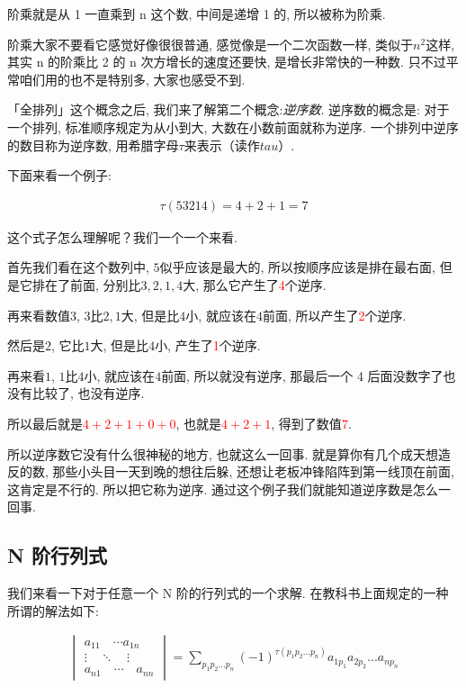 阶乘就是从 1 一直乘到 n 这个数, 中间是递增 1 的, 所以被称为阶乘. 

阶乘大家不要看它感觉好像很很普通, 感觉像是一个二次函数一样, 类似于$n^2$这样, 其实 n 的阶乘比 2 的 n 次方增长的速度还要快, 是增长非常快的一种数. 只不过平常咱们用的也不是特别多, 大家也感受不到. 

「全排列」这个概念之后, 我们来了解第二个概念:\textit{逆序数}. 逆序数的概念是: 对于一个排列, 标准顺序规定为从小到大, 大数在小数前面就称为逆序. 一个排列中逆序的数目称为逆序数, 用希腊字母$\tau$来表示（读作$\mathord{tau}$）. 

下面来看一个例子: 

\begin{align*}
  \tau (53214) = 4+2+1 = 7
\end{align*}

这个式子怎么理解呢？我们一个一个来看. 

首先我们看在这个数列中, $5$似乎应该是最大的, 所以按顺序应该是排在最右面, 但是它排在了前面, 分别比$3,2,1,4$大, 那么它产生了\textcolor{red}{4}个逆序.

再来看数值$3$,  $3$比$2, 1$大, 但是比$4$小, 就应该在$4$前面, 所以产生了\textcolor{red}{2}个逆序.

然后是$2$, 它比$1$大, 但是比$4$小, 产生了\textcolor{red}{1}个逆序. 

再来看$1$,  $1$比$4$小, 就应该在$4$前面, 所以就没有逆序, 那最后一个 4 后面没数字了也没有比较了, 也没有逆序. 

所以最后就是\textcolor{red}{$4 + 2 + 1 + 0 + 0$}, 也就是\textcolor{red}{$4 + 2 + 1$}, 得到了数值\textcolor{red}{7}. 

所以逆序数它没有什么很神秘的地方, 也就这么一回事. 就是算你有几个成天想造反的数, 那些小头目一天到晚的想往后躲, 还想让老板冲锋陷阵到第一线顶在前面, 这肯定是不行的. 所以把它称为逆序. 通过这个例子我们就能知道逆序数是怎么一回事. 

\subsection{N 阶行列式}

我们来看一下对于任意一个 N 阶的行列式的一个求解. 在教科书上面规定的一种所谓的解法如下: 

\begin{align*}
  \begin{vmatrix}
  a_{11} \quad \cdots a_{1n} \\
  \vdots \quad \ddots \quad \vdots \\
  a_{n1} \quad \cdots \quad a_{nn}
  \end{vmatrix}
  = 
  \sum_{p_1p_2...p_n} (-1)^{\tau(p_1p_2...p_n)}a_{1p_1}a_{2p_2}...a_{np_n}
\end{align*}

